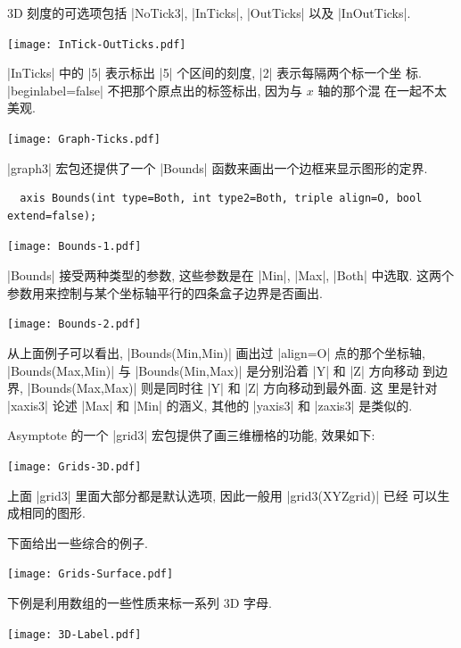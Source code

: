 \documentclass{ctexbook}
\begin{document}
3D 刻度的可选项包括 |NoTick3|, |InTicks|, |OutTicks| 以及
|InOutTicks|.
\begin{center}\texttt{[image: InTick-OutTicks.pdf]}\end{center}%

|InTicks| 中的 |5| 表示标出 |5| 个区间的刻度, |2| 表示每隔两个标一个坐
标. |beginlabel=false| 不把那个原点出的标签标出, 因为与 $x$ 轴的那个混
在一起不太美观.
\begin{center}\texttt{[image: Graph-Ticks.pdf]}\end{center}%

|graph3| 宏包还提供了一个 |Bounds| 函数来画出一个边框来显示图形的定界.
\begin{lstlisting}
  axis Bounds(int type=Both, int type2=Both, triple align=O, bool extend=false);
\end{lstlisting}
\begin{center}\texttt{[image: Bounds-1.pdf]}\end{center}%

|Bounds| 接受两种类型的参数, 这些参数是在 |Min|, |Max|, |Both| 中选取.
这两个参数用来控制与某个坐标轴平行的四条盒子边界是否画出.
\begin{center}\texttt{[image: Bounds-2.pdf]}\end{center}%

从上面例子可以看出, |Bounds(Min,Min)| 画出过 |align=O| 点的那个坐标轴,
|Bounds(Max,Min)| 与 |Bounds(Min,Max)| 是分别沿着 |Y| 和 |Z| 方向移动
到边界,  |Bounds(Max,Max)| 则是同时往 |Y| 和 |Z| 方向移动到最外面. 这
里是针对 |xaxis3| 论述 |Max| 和 |Min| 的涵义, 其他的 |yaxis3| 和
|zaxis3| 是类似的.

Asymptote 的一个 |grid3| 宏包提供了画三维栅格的功能, 效果如下:
\begin{center}\texttt{[image: Grids-3D.pdf]}\end{center}%

上面 |grid3| 里面大部分都是默认选项, 因此一般用 |grid3(XYZgrid)| 已经
可以生成相同的图形.

下面给出一些综合的例子.
\begin{center}\texttt{[image: Grids-Surface.pdf]}\end{center}%


下例是利用数组的一些性质来标一系列 3D 字母.
\begin{center}\texttt{[image: 3D-Label.pdf]}\end{center}%

\end{document}
